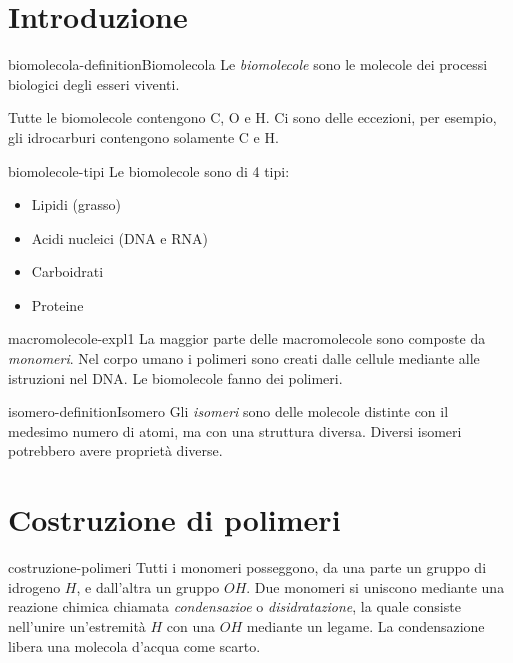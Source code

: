 \documentclass[preview]{standalone}
\begin{document}
\genpage

\section{Introduzione}

\begin{snippetdefinition}{biomolecola-definition}{Biomolecola}
    Le \textit{biomolecole} sono le molecole dei processi biologici degli esseri viventi.
\end{snippetdefinition}

\begin{plainhtml}
    Tutte le biomolecole contengono C, O e H.
Ci sono delle eccezioni, per esempio, gli idrocarburi contengono solamente C e H.
\end{plainhtml}

\begin{snippet}{biomolecole-tipi}
    Le biomolecole sono di 4 tipi:
    \begin{itemize}
        \item Lipidi (grasso)
        \item Acidi nucleici (DNA e RNA)
        \item Carboidrati
        \item Proteine
    \end{itemize}
\end{snippet}

\begin{snippet}{macromolecole-expl1}
    La maggior parte delle macromolecole sono composte da \textit{monomeri}. 
    Nel corpo umano i polimeri sono creati dalle cellule mediante alle istruzioni nel DNA.
    Le biomolecole fanno dei polimeri.
\end{snippet}

\begin{snippetdefinition}{isomero-definition}{Isomero}
    Gli \textit{isomeri} sono delle molecole distinte con il medesimo numero di atomi,
    ma con una struttura diversa. Diversi isomeri potrebbero avere proprietà diverse.
\end{snippetdefinition}

\section{Costruzione di polimeri}

\begin{snippet}{costruzione-polimeri}
  Tutti i monomeri posseggono, da una parte un gruppo di idrogeno \(H\),
  e dall'altra un gruppo \(OH\).
  Due monomeri si uniscono mediante una reazione chimica chiamata \textit{condensazioe} o \textit{disidratazione}, la quale consiste
  nell'unire un'estremità \(H\) con una \(OH\) mediante un legame.
  La condensazione libera una molecola d'acqua come scarto.
\end{snippet}
\end{document}
